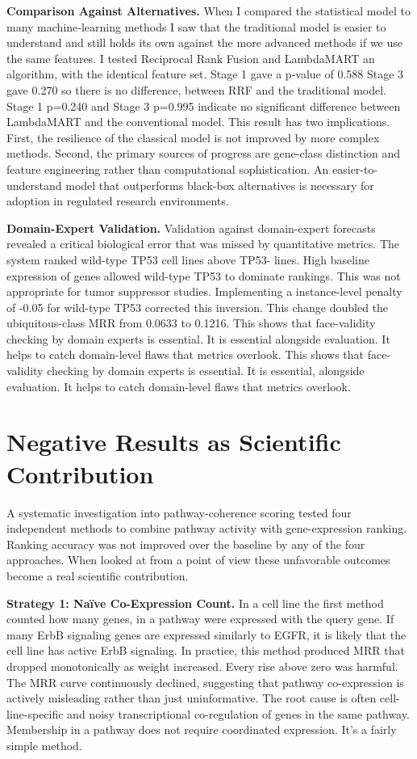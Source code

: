 \documentclass[author={Karen Coutinho, Ishaan Bhalla, Aman Raj, Dixit Kaloorani Malarmannan},
                supervisor={Dr. Daniel D'Andrea},
                degree={MSc},
                title={CellSelector Omics: A Multi-Omics Recommendation System for Cell Line Selection},
                subtitle={},
                type={},
                year={2026}]{dissertation}
\begin{document}
{\bf Comparison Against Alternatives.} When I compared the statistical model to many machine‑learning methods I saw that the traditional model is easier to understand and still holds its own against the more advanced methods if we use the same features. I tested Reciprocal Rank Fusion and LambdaMART an algorithm, with the identical feature set. Stage 1 gave a p‑value of 0.588 Stage 3 gave 0.270 so there is no difference, between RRF and the traditional model. Stage 1 p=0.240 and Stage 3 p=0.995 indicate no significant difference between LambdaMART and the conventional model. This result has two implications. First, the resilience of the classical model is not improved by more complex methods. Second, the primary sources of progress are gene-class distinction and feature engineering rather than computational sophistication. An easier-to-understand model that outperforms black-box alternatives is necessary for adoption in regulated research environments.

{\bf Domain-Expert Validation.} Validation against domain-expert forecasts revealed a critical biological error that was missed by quantitative metrics. The system ranked wild-type TP53 cell lines above TP53- lines. High baseline expression of genes allowed wild-type TP53 to dominate rankings. This was not appropriate for tumor suppressor studies. Implementing a instance-level penalty of -0.05 for wild-type TP53 corrected this inversion. This change doubled the ubiquitous-class MRR from 0.0633 to 0.1216. This shows that face-validity checking by domain experts is essential. It is essential alongside evaluation. It helps to catch domain-level flaws that metrics overlook. This shows that face-validity checking by domain experts is essential. It is essential, alongside evaluation. It helps to catch domain-level flaws that metrics overlook.

\section{Negative Results as Scientific Contribution}

A systematic investigation into pathway-coherence scoring tested four independent methods to combine pathway activity with gene-expression ranking. Ranking accuracy was not improved over the baseline by any of the four approaches. When looked at from a point of view these unfavorable outcomes become a real scientific contribution.

{\bf Strategy 1: Naïve Co-Expression Count.} In a cell line the first method counted how many genes, in a pathway were expressed with the query gene. If many ErbB signaling genes are expressed similarly to EGFR, it is likely that the cell line has active ErbB signaling. In practice, this method produced MRR that dropped monotonically as weight increased. Every rise above zero was harmful. The MRR curve continuously declined, suggesting that pathway co-expression is actively misleading rather than just uninformative. The root cause is often cell-line-specific and noisy transcriptional co-regulation of genes in the same pathway. Membership in a pathway does not require coordinated expression. It's a fairly simple method.
\end{document}
